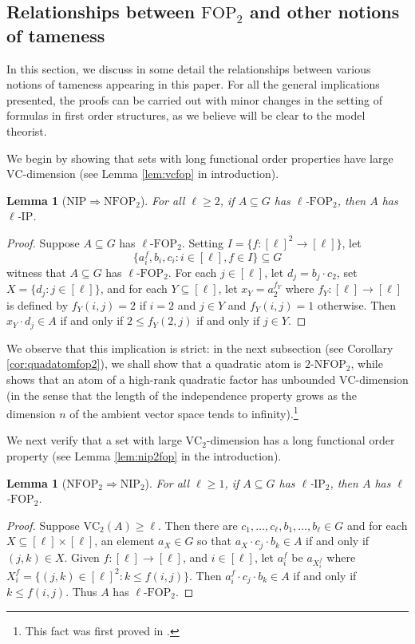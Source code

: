 \documentclass[12pt,oneside,british,a4wide]{amsart}
\newtheorem{lemma}[theorem]{Lemma}
\numberwithin{equation}{section}
\theoremstyle{definition}
\def\FOP{\mathrm{FOP}}
\def\NFOP{\mathrm{NFOP}}
\def\IP{\mathrm{IP}}
\def\NIP{\mathrm{NIP}}
\def\VC{\mathrm{VC}}
\begin{document}
\subsection{Relationships between $\FOP_2$ and other notions of tameness}\label{subsec:fopbasic}
In this section, we discuss in some detail the relationships between various notions of tameness appearing in this paper. For all the general implications presented, the proofs can be carried out with minor changes in the setting of formulas in first order structures, as we believe will be clear to the model theorist.

We begin by showing that sets with long functional order properties have large $\VC$-dimension (see Lemma \ref{lem:vcfop} in introduction).

\begin{lemma}[$\NIP \Rightarrow \NFOP_2$]\label{lem:fopvc}
For all $\ell\geq 2$, if $A\subseteq G$ has $\ell$-$\FOP_2$, then $A$ has $\ell$-$\IP$.
\end{lemma}
\begin{proof}
Suppose $A\subseteq G$ has $\ell$-$\FOP_2$.  Setting  $I=\{f:[\ell]^2\rightarrow [\ell]\}$, let 
$$
\{a_i^f, b_i,c_i: i\in [\ell], f\in I\}\subseteq G 
$$
witness that $A\subseteq G$ has $\ell$-$\FOP_2$.  For each $j\in [\ell]$, let $d_j=b_j\cdot c_2$, set $X=\{d_j: j\in [\ell]\}$, and for each $Y\subseteq [\ell]$, let $x_Y=a_2^{f_Y}$ where $f_Y:[\ell]\rightarrow [\ell]$ is defined by $f_Y(i,j)=2$ if $i=2$ and $j\in Y$ and $f_Y(i,j)=1$ otherwise.  Then $x_Y\cdot d_j\in A$ if and only if $2\leq f_Y(2,j)$ if and only if $j\in Y$.  
\end{proof}

We observe that this implication is strict: in the next subsection (see Corollary \ref{cor:quadatomfop2}), we shall show that a quadratic atom is $2$-$\NFOP_2$, while \cite[Lemma 3.9]{Terry.2021d} shows that an atom of a high-rank quadratic factor has unbounded $\VC$-dimension (in the sense that the length of the independence property grows as the dimension $n$ of the ambient vector space tends to infinity).\footnote{This fact was first proved in \cite[Example 5.1]{Terry.2021av2}.} 

We next verify that a set with large $\VC_2$-dimension has a long functional order property (see Lemma \ref{lem:nip2fop} in the introduction).

\begin{lemma}[$\NFOP_2 \Rightarrow \NIP_2$]\label{lem:vc2fop}
For all $\ell\geq 1$, if $A\subseteq G$ has $\ell$-$\IP_2$, then $A$ has $\ell$-$\FOP_2$. 
\end{lemma}
\begin{proof}
Suppose $\VC_2(A)\geq \ell$.  Then there are $c_1,\ldots, c_{\ell}, b_1,\ldots, b_{\ell}\in G$ and for each $X\subseteq [\ell]\times [\ell]$, an element $a_X\in G$ so that $a_X\cdot c_j\cdot b_k \in A$ if and only if $(j,k)\in X$.  Given $f:[\ell]\rightarrow [\ell]$, and $i\in [\ell]$, let $a_i^f$ be $a_{X_i^f}$ where $X_i^f=\{(j,k)\in [\ell]^2: k\leq f(i,j)\}$.  Then $ a_i^f\cdot c_j \cdot b_k\in A$ if and only if $k\leq f(i,j)$.  Thus $A$ has $\ell$-$\FOP_2$.
\end{proof}
\end{document}
